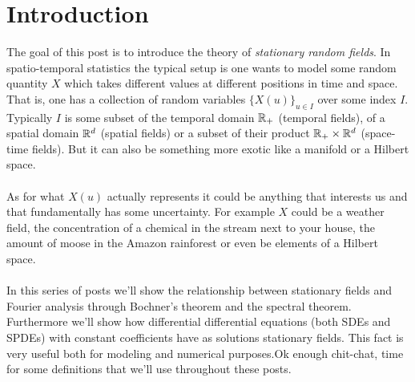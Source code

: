 \documentclass[
    a4paper,
    DIV=14,
    abstract=true,
    numbers=noenddot
]{scrartcl}
\begin{document}
\section{Introduction}

The goal of this post is to introduce the theory of \emph{stationary random fields}. In spatio-temporal statistics the typical setup is one wants to model some random quantity $X$ which takes
different values at different positions in time and space. That is, one has a collection of random variables $\{X(u)\}_{u\in I}$ over some index $I$. Typically  $I$ is some subset
of the temporal domain $\mathbb{R}_+$ (temporal fields), of a spatial domain $\mathbb{R}^d$ (spatial fields) or a subset of their product $\mathbb{R}_+\times\mathbb{R}^d$ (space-time fields). But it can also be something more exotic like
a manifold or a Hilbert space.
\\\\
As for what $X(u)$ actually represents it could be anything
that interests us and that fundamentally has some uncertainty. For example  $X$ could be a weather field, the concentration of a chemical in the stream next to your house, the amount of moose in the
Amazon rainforest or even be elements of a Hilbert space. \\
\\
In this series of posts we'll show the relationship between stationary fields and Fourier analysis through Bochner's theorem and the spectral theorem. Furthermore we'll show how differential differential equations (both SDEs and SPDEs) with constant coefficients have as solutions stationary fields. This fact is very useful both for modeling and numerical purposes.Ok enough chit-chat, time for some definitions that we'll use throughout these posts.
\end{document}
